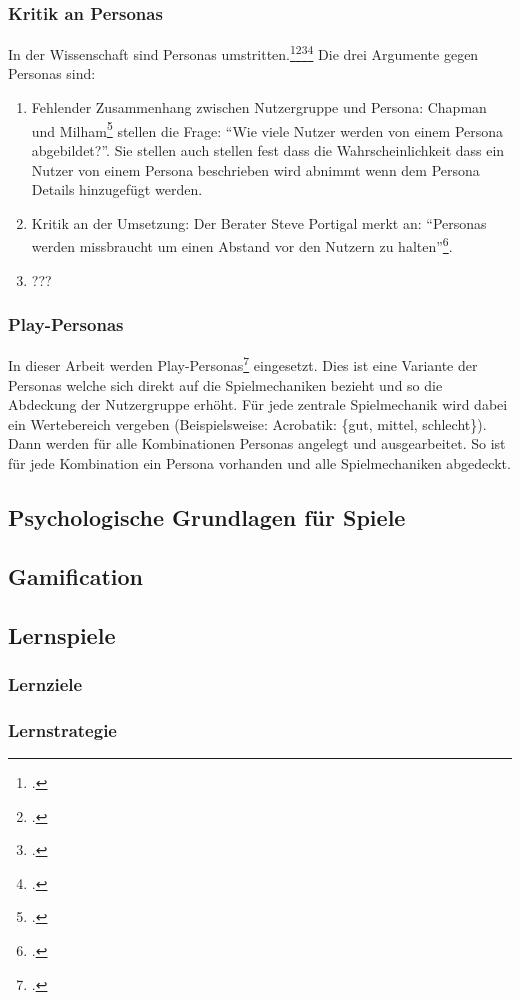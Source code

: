 	\subsubsection{Kritik an Personas}
		In der Wissenschaft sind Personas umstritten.\footcite{persona-crit}\footcite{persona-crit2}\footcite{persona-crit3}\footcite{persona-crit4} Die drei Argumente gegen Personas sind:
		\begin{enumerate}
			\item{ Fehlender Zusammenhang zwischen Nutzergruppe und Persona: Chapman und Milham\footcite{persona-crit} stellen die Frage: \enquote{Wie viele Nutzer werden von einem Persona abgebildet?}. Sie stellen auch stellen fest dass die Wahrscheinlichkeit dass ein Nutzer von einem Persona beschrieben wird abnimmt wenn dem Persona Details hinzugefügt werden. }
			\item{ Kritik an der Umsetzung: Der Berater Steve Portigal merkt an: \enquote{Personas werden missbraucht um einen Abstand vor den Nutzern zu halten}\footcite{persona-crit4}. }
			\item{ ??? }
		\end{enumerate}
	\subsubsection{Play-Personas}
		In dieser Arbeit werden Play-Personas\footcite{play-persona} eingesetzt. Dies ist eine Variante der Personas welche sich direkt auf die Spielmechaniken bezieht und so die Abdeckung der Nutzergruppe erhöht. Für jede zentrale Spielmechanik wird dabei ein Wertebereich vergeben (Beispielsweise: Acrobatik: \{gut, mittel, schlecht\}). Dann werden für alle Kombinationen Personas angelegt und ausgearbeitet. So ist für jede Kombination ein Persona vorhanden und alle Spielmechaniken abgedeckt.
\subsection{Psychologische Grundlagen für Spiele}
\subsection{Gamification}
\subsection{Lernspiele}
	\subsubsection{Lernziele}
	\subsubsection{Lernstrategie}
